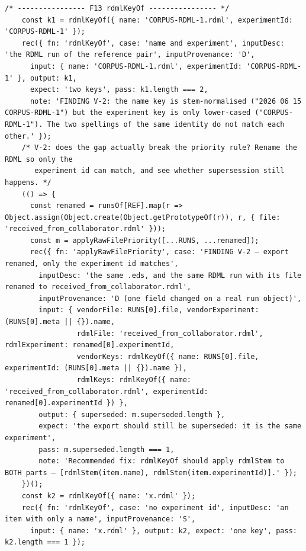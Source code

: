 \begin{lstlisting}[style=js]
    /* ---------------- F13 rdmlKeyOf ---------------- */
    const k1 = rdmlKeyOf({ name: 'CORPUS-RDML-1.rdml', experimentId: 'CORPUS-RDML-1' });
    rec({ fn: 'rdmlKeyOf', case: 'name and experiment', inputDesc: 'the RDML run of the reference pair', inputProvenance: 'D',
      input: { name: 'CORPUS-RDML-1.rdml', experimentId: 'CORPUS-RDML-1' }, output: k1,
      expect: 'two keys', pass: k1.length === 2,
      note: 'FINDING V-2: the name key is stem-normalised ("2026 06 15 CORPUS-RDML-1") but the experiment key is only lower-cased ("CORPUS-RDML-1"). The two spellings of the same identity do not match each other.' });
    /* V-2: does the gap actually break the priority rule? Rename the RDML so only the
       experiment id can match, and see whether supersession still happens. */
    (() => {
      const renamed = runsOf[REF].map(r => Object.assign(Object.create(Object.getPrototypeOf(r)), r, { file: 'received_from_collaborator.rdml' }));
      const m = applyRawFilePriority([...RUNS, ...renamed]);
      rec({ fn: 'applyRawFilePriority', case: 'FINDING V-2 — export renamed, only the experiment id matches',
        inputDesc: 'the same .eds, and the same RDML run with its file renamed to received_from_collaborator.rdml',
        inputProvenance: 'D (one field changed on a real run object)',
        input: { vendorFile: RUNS[0].file, vendorExperiment: (RUNS[0].meta || {}).name,
                 rdmlFile: 'received_from_collaborator.rdml', rdmlExperiment: renamed[0].experimentId,
                 vendorKeys: rdmlKeyOf({ name: RUNS[0].file, experimentId: (RUNS[0].meta || {}).name }),
                 rdmlKeys: rdmlKeyOf({ name: 'received_from_collaborator.rdml', experimentId: renamed[0].experimentId }) },
        output: { superseded: m.superseded.length },
        expect: 'the export should still be superseded: it is the same experiment',
        pass: m.superseded.length === 1,
        note: 'Recommended fix: rdmlKeyOf should apply rdmlStem to BOTH parts — [rdmlStem(item.name), rdmlStem(item.experimentId)].' });
    })();
    const k2 = rdmlKeyOf({ name: 'x.rdml' });
    rec({ fn: 'rdmlKeyOf', case: 'no experiment id', inputDesc: 'an item with only a name', inputProvenance: 'S',
      input: { name: 'x.rdml' }, output: k2, expect: 'one key', pass: k2.length === 1 });


\end{lstlisting}
